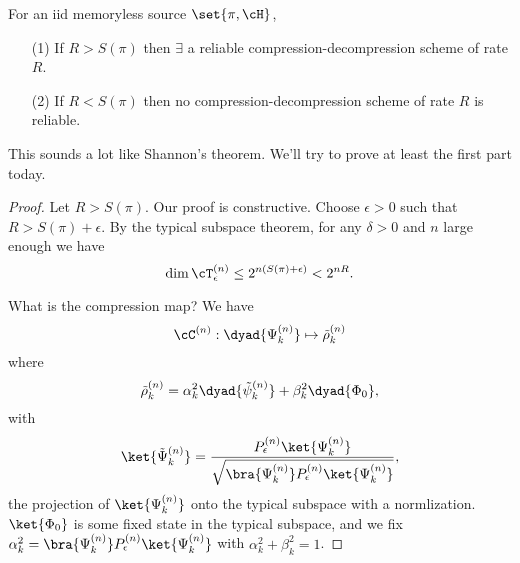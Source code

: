 \begin{thm}[Schumacher]
    For an iid memoryless source $\set{\pi,\cH}$,
    \begin{itemize}
        \item [(1)] If $R>S(\pi)$ then $\exists$ a reliable compression-decompression scheme of rate $R$.
        \item[(2)] If $R<S(\pi)$ then no compression-decompression scheme of rate $R$ is reliable.
    \end{itemize}
\end{thm}
This sounds a lot like Shannon's theorem. We'll try to prove at least the first part today.
\begin{proof}
    Let $R>S(\pi)$. Our proof is constructive. Choose $\epsilon>0$ such that $R>S(\pi) + \epsilon$. By the typical subspace theorem, for any $\delta>0$ and $n$ large enough we have
    \begin{equation}
        \dim \cT_\epsilon^{(n)} \leq 2^{n(S(\pi)+\epsilon)} < 2^{nR}.
    \end{equation}
    
    What is the compression map? We have
    \begin{equation}
        \cC^{(n)}:\dyad{\Psi_k^{(n)}} \mapsto \tilde \rho_k^{(n)}
    \end{equation}
    where
    \begin{equation}
        \tilde \rho_k^{(n)}=\alpha_k^2 \dyad{\tilde \psi_k^{(n)}}+\beta_k^2 \dyad{\Phi_0},
    \end{equation}
    with
    \begin{equation}
        \ket{\tilde \Psi_k^{(n)}} = \frac{P_\epsilon^{(n)}\ket{\Psi_k^{(n)}}}{\sqrt{\bra{\Psi_k^{(n)}}P_\epsilon^{(n)} \ket{\Psi_k^{(n)}}}},
    \end{equation}
    the projection of $\ket{\Psi_k^{(n)}}$
    onto the typical subspace with a normlization. $\ket{\Phi_0}$ is some fixed state in the typical subspace, and we fix $\alpha_k^2= \bra{\Psi_k^{(n)}}P_\epsilon^{(n)} \ket{\Psi_k^{(n)}}$ with $\alpha_k^2 +\beta_k^2=1$.
    

\end{proof}

